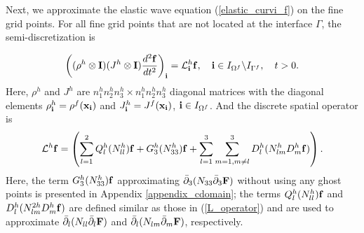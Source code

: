 {Next, we approximate the elastic wave equation (\ref{elastic_curvi_f}) on the fine grid points. For all fine grid points that are not located at the interface $\Gamma$, the semi-discretization  is
{%
\begin{equation}\label{elastic_semi_f}
\left(({\rho}^{h}\otimes{\bf I})(J^h\otimes{\bf I})\frac{d^2{{\bf f}}}{dt^2}\right)_{\bf i} = {\mathcal{L}}^{h}_{\bf i} {{\bf f}},\quad {\bf i}\in I_{\Omega^f}\backslash I_{{\Gamma^f}},\quad t>0.
\end{equation}
Here, $\rho^{h}$ and $J^{h}$ are $n_1^{h}n_2^{h}n_3^{h}\times n_1^{h}n_2^{h}n_3^{h}$ diagonal matrices with the diagonal elements $\rho^h_{\bf i} = \rho^f({\bf x}_{\bf i})$ and $J^h_{\bf i} = J^f({\bf x}_{\bf i})$, ${\bf i}\in I_{\Omega^f}$. And the discrete spatial operator is
\begin{equation}\label{Lf_operator}
{\mathcal{L}}^{h} {{\bf f}} = \left(\sum_{l=1}^2{Q}_l^{h}({N}_{ll}^h){\bf f}+{G}_3^{h}({N}_{33}^h){\bf f}+\sum_{l=1}^3\sum_{m=1,m\neq l}^3{D}_l^{h}({N}_{lm}^{h}{D}_m^{h}{\bf f})\right).
\end{equation}
Here, the term ${G}_3^{h}(N_{33}^{h}){\bf f}$ approximating $\bar{\partial}_3(N_{33}\bar{\partial}_3 {\bf F})$ without using any ghost points is presented in Appendix \ref{appendix_cdomain}; the terms $Q_l^{h}(N_{ll}^{h}){\bf f}$ and $D_{l}^{h}(N_{lm}^{2h}D_m^{h}{\bf f})$ are defined similar as those in (\ref{L_operator}) and are used to approximate $\bar{\partial}_l(N_{ll}\bar{\partial}_l{\bf F})$ and $\bar{\partial}_l(N_{lm}\bar{\partial}_m {\bf F})$, respectively. %

}}

